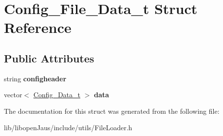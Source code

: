 \hypertarget{struct_config___file___data__t}{\section{\-Config\-\_\-\-File\-\_\-\-Data\-\_\-t \-Struct \-Reference}
\label{struct_config___file___data__t}
}
\subsection*{\-Public \-Attributes}
\begin{DoxyCompactItemize}
\item 
\hypertarget{struct_config___file___data__t_a91249d3f9ab09e1f36ca0e6d21daef39}{string {\bfseries configheader}}\label{struct_config___file___data__t_a91249d3f9ab09e1f36ca0e6d21daef39}

\item 
\hypertarget{struct_config___file___data__t_a678651f7e98b0c005023d051dc986a8b}{vector$<$ \hyperlink{struct_config___data__t}{\-Config\-\_\-\-Data\-\_\-t} $>$ {\bfseries data}}\label{struct_config___file___data__t_a678651f7e98b0c005023d051dc986a8b}

\end{DoxyCompactItemize}


\-The documentation for this struct was generated from the following file\-:\begin{DoxyCompactItemize}
\item 
lib/libopen\-Jaus/include/utils/\-File\-Loader.\-h\end{DoxyCompactItemize}
